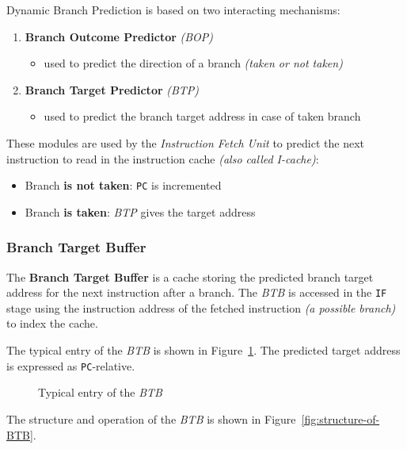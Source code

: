 \documentclass[english]{article}
\begin{document}
\bigskip
Dynamic Branch Prediction is based on two interacting mechanisms:

\begin{enumerate}
  \item \textbf{Branch Outcome Predictor} \textit{(BOP)}
        \begin{itemize}
          \item used to predict the direction of a branch \textit{(taken or not taken)}
        \end{itemize}
  \item \textbf{Branch Target Predictor} \textit{(BTP)}
        \begin{itemize}
          \item used to predict the branch target address in case of taken branch
        \end{itemize}
\end{enumerate}

These modules are used by the \textit{Instruction Fetch Unit} to predict the next instruction to read in the instruction cache \textit{(also called I-cache)}:

\begin{itemize}
  \item Branch \textbf{is not taken}: \texttt{PC} is incremented
  \item Branch \textbf{is taken}: \textit{BTP} gives the target address
\end{itemize}

\subsubsection{Branch Target Buffer}

The \textbf{Branch Target Buffer} is a cache storing the predicted branch target address for the next instruction after a branch.
The \textit{BTB} is accessed in the \texttt{IF} stage using the instruction address of the fetched instruction \textit{(a possible branch)} to index the cache.

The typical entry of the \textit{BTB} is shown in Figure~\ref{fig:typical-entry-BTB}.
The predicted target address is expressed as \texttt{PC}-relative.

\begin{figure}[htbp]
  \bigskip
  \centering
  \caption{Typical entry of the \textit{BTB}}
  \label{fig:typical-entry-BTB}
  \bigskip
\end{figure}

The structure and operation of the \textit{BTB} is shown in Figure~\ref{fig:structure-of-BTB}.
\end{document}
